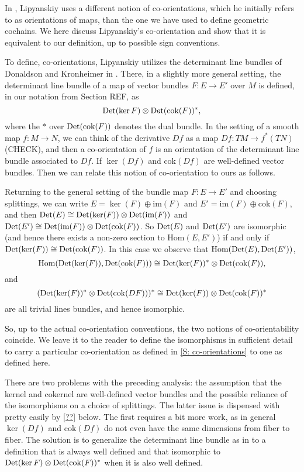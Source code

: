 \documentclass[12pt]{article}
\theoremstyle{plain}
\theoremstyle{definition}
\theoremstyle{remark}
\newcommand{\Hom}{\text{Hom}}
\newcommand{\im}{\text{im}}
\newcommand{\cok}{\text{cok}}
\newcommand{\Or}{{\rm Det}}
\begin{document}
In \cite{Lipy14}, Lipyanskiy uses a different notion of co-orientations, which he initially refers to as orientations of maps, than the one we have used to define geometric cochains. We here discuss Lipyanskiy's co-orientation and show that it is equivalent to our definition, up to possible sign conventions.

To define, co-orientations, Lipyanskiy utilizes the determinant line bundles of Donaldson and Kronheimer in \cite[Section 5.2.1]{DoKr90}. There, in a slightly more general setting, the determinant line bundle of a map of vector bundles $F:E\to E'$ over $M$ is defined, in our notation from Section REF, as $$\Or(\ker F)\otimes \Or(\cok(F))^*,$$ 
where the $*$ over $\Or(\cok(F))$ denotes the dual bundle. In the setting of a smooth map $f:M\to N$, we can think of the derivative $Df$ as a map $Df:TM\to f^*(TN)$ (CHECK), and then a co-orientation of $f$ is an orientation of the determinant line bundle associated to $Df$. If $\ker(Df)$ and $\cok(Df)$ are well-defined vector bundles. Then we can relate this notion of co-orientation to ours as follows.

Returning to the general setting of the bundle map $F:E\to E'$ and choosing splittings, we can write $E= \ker(F)\oplus \im(F)$ and $E'=\im(F)\oplus \cok(F)$, and then $\Or(E)\cong \Or(\ker(F))\otimes \Or(\im(F))$ and $\Or(E')\cong \Or(\im(F))\otimes \Or(\cok(F))$. 
So $\Or(E)$ and $\Or(E')$ are isomorphic (and hence there exists a non-zero section to $\Hom(E,E')$) if and only if  $\Or(\ker(F))\cong \Or(\cok(F))$. In this case we observe that $\Hom(\Or(E),\Or(E'))$, $$\Hom(\Or(\ker(F)), \Or(\cok(F)))\cong \Or(\ker(F))^*\otimes \Or(\cok(F)),$$ 
and $$(\Or(\ker(F))^*\otimes \Or(\cok(DF)))^*\cong \Or(\ker(F))\otimes \Or(\cok(F))^*$$
are all trivial lines bundles, and hence isomorphic. 

So, up to the actual co-orientation conventions, the two notions of co-orientability coincide. We leave it to the reader to define the isomorphisms in sufficient detail to carry a particular co-orientation as defined in \cref{S: co-orientations} to one as defined here.

There are two problems with the preceding analysis: the assumption that the kernel and cokernel are well-defined vector bundles and the possible reliance of the isomorphisms on a choice of splittings. The latter issue is dispensed with pretty easily by \cref{??} below. The first requires a bit more work, as in general $\ker(Df)$ and $\cok(Df)$ do not even have the same dimensions from fiber to fiber. The solution is to generalize the determinant line bundle as in \cite{DoKr90} to a definition that is always well defined and that isomorphic to $\Or(\ker F)\otimes \Or(\cok(F))^*$ when it is also well defined. 
\end{document}

